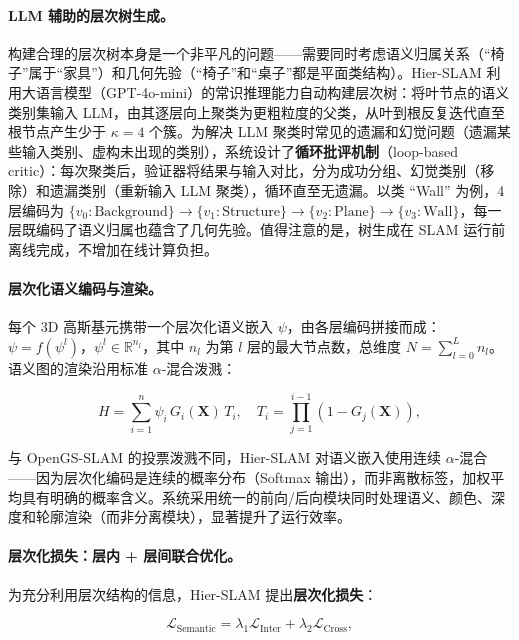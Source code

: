 \paragraph{LLM 辅助的层次树生成。}
构建合理的层次树本身是一个非平凡的问题——需要同时考虑语义归属关系（``椅子''属于``家具''）和几何先验（``椅子''和``桌子''都是平面类结构）。Hier-SLAM 利用大语言模型（GPT-4o-mini）的常识推理能力自动构建层次树：将叶节点的语义类别集输入 LLM，由其逐层向上聚类为更粗粒度的父类，从叶到根反复迭代直至根节点产生少于 $\kappa = 4$ 个簇。为解决 LLM 聚类时常见的遗漏和幻觉问题（遗漏某些输入类别、虚构未出现的类别），系统设计了\textbf{循环批评机制}（loop-based critic）：每次聚类后，验证器将结果与输入对比，分为成功分组、幻觉类别（移除）和遗漏类别（重新输入 LLM 聚类），循环直至无遗漏。以类 ``Wall'' 为例，4 层编码为 $\{v_0{:}\text{Background}\} \to \{v_1{:}\text{Structure}\} \to \{v_2{:}\text{Plane}\} \to \{v_3{:}\text{Wall}\}$，每一层既编码了语义归属也蕴含了几何先验。值得注意的是，树生成在 SLAM 运行前离线完成，不增加在线计算负担。

\paragraph{层次化语义编码与渲染。}
每个 3D 高斯基元携带一个层次化语义嵌入 $\psi$，由各层编码拼接而成：$\psi = f(\psi^l)$，$\psi^l \in \mathbb{R}^{n_l}$，其中 $n_l$ 为第 $l$ 层的最大节点数，总维度 $N = \sum_{l=0}^L n_l$。语义图的渲染沿用标准 $\alpha$-混合泼溅：

\begin{equation*}
H = \sum_{i=1}^n \psi_i \, G_i(\mathbf{X}) \, T_i, \quad T_i = \prod_{j=1}^{i-1}(1 - G_j(\mathbf{X})),
\end{equation*}

与 OpenGS-SLAM 的投票泼溅不同，Hier-SLAM 对语义嵌入使用连续 $\alpha$-混合——因为层次化编码是连续的概率分布（Softmax 输出），而非离散标签，加权平均具有明确的概率含义。系统采用统一的前向/后向模块同时处理语义、颜色、深度和轮廓渲染（而非分离模块），显著提升了运行效率。

\paragraph{层次化损失：层内 + 层间联合优化。}
为充分利用层次结构的信息，Hier-SLAM 提出\textbf{层次化损失}：

\begin{equation*}
\mathcal{L}_{\text{Semantic}} = \lambda_1 \mathcal{L}_{\text{Inter}} + \lambda_2 \mathcal{L}_{\text{Cross}},
\end{equation*}

